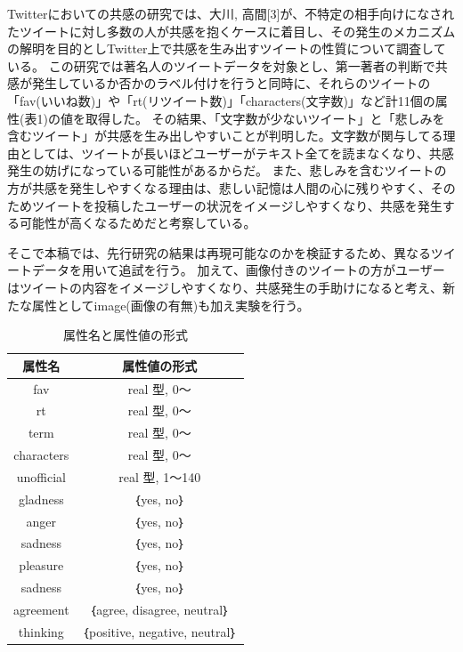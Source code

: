 \documentclass[dvipdfmx]{issj}
\begin{document}
Twitterにおいての共感の研究では、大川, 高間[3]が、不特定の相手向けになされたツイートに対し多数の人が共感を抱くケースに着目し、その発生のメカニズムの解明を目的としTwitter上で共感を生み出すツイートの性質について調査している。
この研究では著名人のツイートデータを対象とし、第一著者の判断で共感が発生しているか否かのラベル付けを行うと同時に、それらのツイートの「fav(いいね数)」や「rt(リツイート数)」「characters(文字数)」など計11個の属性(表1)の値を取得した。
その結果、「文字数が少ないツイート」と「悲しみを含むツイート」が共感を生み出しやすいことが判明した。文字数が関与してる理由としては、ツイートが長いほどユーザーがテキスト全てを読まなくなり、共感発生の妨げになっている可能性があるからだ。
また、悲しみを含むツイートの方が共感を発生しやすくなる理由は、悲しい記憶は人間の心に残りやすく、そのためツイートを投稿したユーザーの状況をイメージしやすくなり、共感を発生する可能性が高くなるためだと考察している。

そこで本稿では、先行研究の結果は再現可能なのかを検証するため、異なるツイートデータを用いて追試を行う。
加えて、画像付きのツイートの方がユーザーはツイートの内容をイメージしやすくなり、共感発生の手助けになると考え、新たな属性としてimage(画像の有無)も加え実験を行う。



\begin{table}[t]\centering
\caption{属性名と属性値の形式}\label{tbl:font}
\begin{small}
\begin{tabular}{|c|c|} \hline
属性名            & 属性値の形式\\\hline\hline
fav & real 型, 0～\\\hline
rt  &  real 型, 0～\\\hline
term  & real 型, 0～\\\hline
characters         & real 型, 0～\\\hline
unofficial      &  real 型, 1～140\\\hline
gladness & ｛yes, no｝\\\hline
anger & ｛yes, no｝\\\hline
sadness & ｛yes, no｝\\\hline
pleasure & ｛yes, no｝\\\hline
sadness & ｛yes, no｝\\\hline
agreement & ｛agree, disagree, neutral｝\\\hline
thinking & ｛positive, negative, neutral｝\\\hline
\end{tabular}
\end{small}
\end{table}
\end{document}
